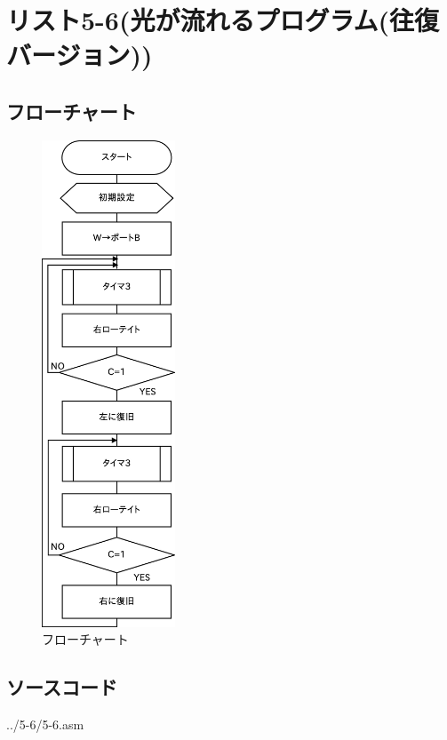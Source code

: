 \documentclass[a4paper,12pt]{ujarticle}
\begin{document}
 \section{リスト5-6(光が流れるプログラム(往復バージョン))}
  \subsection{フローチャート}
  \begin{figure}[htbp]
   \begin{center}
    \includegraphics[height=145mm]{Diagram5-6.eps}
   \end{center}
   \caption{フローチャート}
   \label{fig}
  \end{figure}
  \subsection{ソースコード}
  \begin{lstinputlisting}[basicstyle=\ttfamily\footnotesize, frame=single]
   {../5-6/5-6.asm}
  \end{lstinputlisting}
\end{document}
